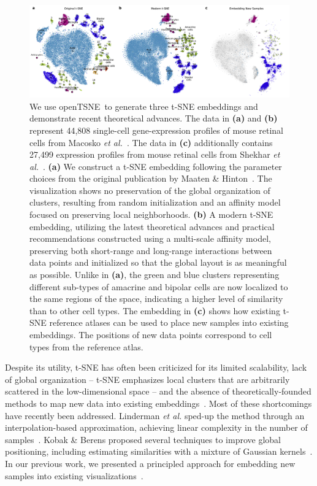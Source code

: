 \documentclass[twocolumn]{article}
\newcommand{\opentsne}{\textsf{openTSNE}}
\begin{document}
\begin{figure}[htbp]
  \includegraphics[width=\textwidth]{macosko2015}
  \caption{\label{fig:macosko}
  We use \opentsne\ to generate three t-SNE embeddings and demonstrate recent
  theoretical advances. The data in \textbf{(a)} and \textbf{(b)} represent 44,808
  single-cell gene-expression profiles of mouse retinal cells from Macosko
  \textit{et al.}~\cite{macosko2015highly}. The data in \textbf{(c)}
  additionally contains 27,499 expression profiles from mouse
  retinal cells from Shekhar \textit{et al.}~\cite{shekhar2016comprehensive}.
  \textbf{(a)} We construct a t-SNE
  embedding following the parameter choices from the original publication
  by Maaten \& Hinton~\cite{maaten2008visualizing}. The visualization
  shows no preservation of the global organization of clusters,
  resulting from random initialization and an affinity model focused on
  preserving local neighborhoods. \textbf{(b)} A modern t-SNE
  embedding, utilizing the latest theoretical advances and practical
  recommendations constructed using a multi-scale
  affinity model, preserving both short-range and long-range interactions
  between data points and initialized so that the global layout is
  as meaningful as possible. Unlike in \textbf{(a)}, the green and blue clusters
  representing different sub-types of amacrine and bipolar cells are now
  localized to the same regions of the space, indicating a higher level
  of similarity than to other cell types. The embedding in \textbf{(c)} shows how existing
  t-SNE reference atlases can be used to place new samples into existing
  embeddings. The positions of new data points correspond to cell types
  from the reference atlas.
}
\end{figure}

Despite its utility, t-SNE has often been criticized for its limited
scalability, lack of global organization -- t-SNE emphasizes local clusters that
are arbitrarily scattered in the low-dimensional space -- and the absence of
theoretically-founded methods to map new data into existing
embeddings~\cite{ding2018interpretable,becht2019dimensionality}. Most of these
shortcomings have recently been addressed. Linderman \textit{et al.} sped-up the
method through an interpolation-based approximation, achieving linear complexity
in the number of samples~\cite{linderman2019fast}. Kobak \& Berens proposed
several techniques to improve global positioning, including estimating
similarities with a mixture of Gaussian kernels~\cite{kobak2019art}. In our
previous work, we presented a principled approach for embedding new samples into
existing visualizations~\cite{policar2019embedding}.
\end{document}
